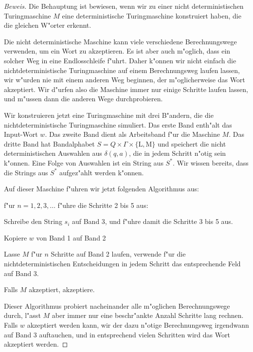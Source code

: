 \begin{proof}[Beweis]
Die Behauptung ist bewiesen, wenn wir zu einer nicht deterministischen
Turingmaschine $M$ eine deterministische Turingmaschine konstruiert haben,
die die gleichen W"orter erkennt.

Die nicht deterministische Maschine kann viele verschiedene Berechnungswege
verwenden, um ein Wort zu akzeptieren.
Es ist aber auch m"oglich, dass ein solcher Weg in eine Endlosschleife f"uhrt.
Daher k"onnen wir nicht einfach die nichtdeterministische Turingmaschine
auf einem Berechnungsweg laufen lassen, wir w"urden nie mit einem
anderen Weg beginnen, der m"oglicherweise das Wort akzeptiert.
Wir d"urfen also die Maschine immer nur einige Schritte laufen lassen,
und m"ussen dann die anderen Wege durchprobieren.

Wir konstruieren jetzt eine Turingmaschine mit drei B"andern, die die
nichtdeterministische Turingmaschine simuliert. Das erste Band
enth"alt das Input-Wort $w$.
Das zweite Band dient als Arbeitsband f"ur die Maschine $M$. Das
dritte Band hat Bandalphabet $S=Q\times \Gamma\times\{\text{L},\text{M}\}$
und speichert die nicht deterministischen Auswahlen aus $\delta(q,a)$,
die  in jedem Schritt n"otig sein k"onnen. Eine Folge von Auswahlen
ist ein String aus $S^*$. Wir wissen bereits, dass die Strings aus $S^*$
aufgez"ahlt werden k"onnen.

Auf dieser Maschine f"uhren
wir jetzt folgenden Algorithmus aus:

\begin{compactenum}
\item f"ur $n=1,2,3,\dots$ f"uhre die Schritte 2 bis 5 aus:
\item Schreibe den String $s_i$  auf Band 3,
und f"uhre damit die Schritte 3 bis 5 aus.
\item Kopiere $w$ von Band 1 auf Band 2
\item Lasse $M$ f"ur $n$ Schritte auf Band 2 laufen, verwende f"ur die
nichtdeterministischen Entscheidungen in jedem Schritt das entsprechende
Feld auf Band 3.
\item Falls $M$ akzeptiert, akzeptiere.
\end{compactenum}
Dieser Algorithmus probiert nacheinander alle m"oglichen Berechnungswege
durch, l"asst $M$ aber immer nur eine beschr"ankte Anzahl Schritte lang
rechnen. Falls $w$ akzeptiert werden kann, wir der dazu n"otige Berechnungsweg
irgendwann auf Band 3 auftauchen, und in entsprechend vielen Schritten wird
das Wort akzeptiert werden.
\end{proof}

